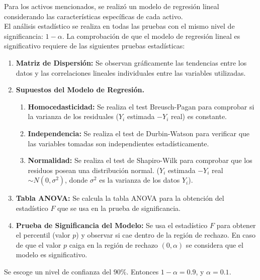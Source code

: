 Para los activos mencionados, se realizó un modelo de regresión lineal considerando 
las características específicas de cada activo. \\ 
El análisis estadístico se realiza en todas las pruebas con el mismo nivel de 
significancia: \(1- \alpha\).
La comprobación de que el modelo de regresión lineal es significativo
requiere de las siguientes pruebas estadísticas:
\begin{enumerate}
	\item \textbf{Matriz de Dispersión:} Se observan gráficamente las tendencias 
		entre los datos y las correlaciones lineales individuales entre las 
		variables utilizadas.
	\item \textbf{Supuestos del Modelo de Regresión.}
		\begin{enumerate}
			\item \textbf{Homocedasticidad:} Se realiza el test Breusch-Pagan para 
				comprobar si la varianza de los residuales (\(Y_i\) estimada
				\( - Y_i\) real) es constante.
			\item \textbf{Independencia:} Se realiza el test de Durbin-Watson para
				verificar que las variables tomadas son independientes estadísticamente.
			\item \textbf{Normalidad:} Se realiza el test de Shapiro-Wilk
				para comprobar que los residuos posean una distribución normal.
				(\(Y_i\) estimada \(- Y_i\) real \(\sim N(0, \sigma ^2)\), donde 
				\(\sigma ^ 2\) es la varianza de los datos \(Y_i\)).
		\end{enumerate}
	\item \textbf{Tabla ANOVA:} Se calcula la tabla ANOVA para la obtención del 
		estadístico \(F\) que se usa en la prueba de significancia.
	\item \textbf{Prueba de Significancia del Modelo:} Se usa el estadístico \(F\) 
		para obtener el percentil (valor \(p\))
		y observar si cae dentro de la región de rechazo.
		En caso de que el valor \(p\) caiga en la región de rechazo \((0, \alpha)\)
		se considera que el modelo es significativo.
\end{enumerate}
Se escoge un nivel de confianza del \(90\%\). Entonces \(1- \alpha =0.9\), y 
\(\alpha = 0.1\).


